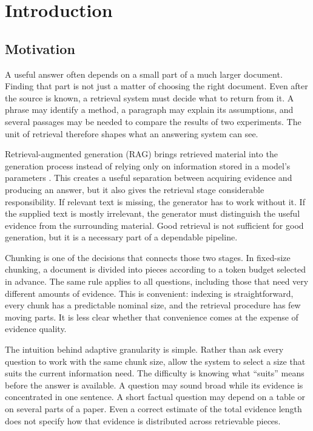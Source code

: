 \chapter{Introduction}
\label{ch:introduction}

\section{Motivation}
A useful answer often depends on a small part of a much larger document.
Finding that part is not just a matter of choosing the right document.
Even after the source is known, a retrieval system must decide what to
return from it. A phrase may identify a method, a paragraph may explain
its assumptions, and several passages may be needed to compare the
results of two experiments. The unit of retrieval therefore shapes what
an answering system can see.

Retrieval-augmented generation (RAG) brings retrieved material into the
generation process instead of relying only on information stored in a
model's parameters \cite{lewis2020rag}. This creates a useful separation
between acquiring evidence and producing an answer, but it also gives
the retrieval stage considerable responsibility. If relevant text is
missing, the generator has to work without it. If the supplied text is
mostly irrelevant, the generator must distinguish the useful evidence
from the surrounding material. Good retrieval is not sufficient for
good generation, but it is a necessary part of a dependable pipeline.

Chunking is one of the decisions that connects those two stages. In
fixed-size chunking, a document is divided into pieces according to a
token budget selected in advance. The same rule applies to all questions,
including those that need very different amounts of evidence. This is
convenient: indexing is straightforward, every chunk has a predictable
nominal size, and the retrieval procedure has few moving parts. It is
less clear whether that convenience comes at the expense of evidence
quality.

The intuition behind adaptive granularity is simple. Rather than ask
every question to work with the same chunk size, allow the system to
select a size that suits the current information need. The difficulty is
knowing what \enquote{suits} means before the answer is available. A
question may sound broad while its evidence is concentrated in one
sentence. A short factual question may depend on a table or on several
parts of a paper. Even a correct estimate of the total evidence length
does not specify how that evidence is distributed across retrievable
pieces.

